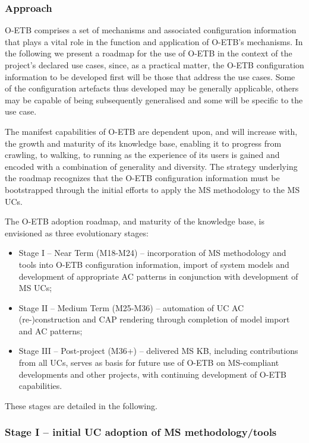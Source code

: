 \documentclass[12pt,twoside,a4paper]{article}
\begin{document}
\hypertarget{approach}{%
\subsubsection{Approach}\label{approach}}

O-ETB comprises a set of mechanisms and associated configuration information that plays a vital role in the function and application of O-ETB's mechanisms. In the following we present a roadmap for the use of O-ETB in the context of the project's declared use cases, since, as a practical matter, the O-ETB configuration information to be developed first will be those that address the use cases. Some of the configuration artefacts thus developed may be generally applicable, others may be capable of being subsequently generalised and some will be specific to the use case.

The manifest capabilities of O-ETB are dependent upon, and will increase with, the growth and maturity of its knowledge base, enabling it to progress from crawling, to walking, to running as the experience of its users is gained and encoded with a combination of generality and diversity. The strategy underlying the roadmap recognizes that the O-ETB configuration information must be bootstrapped through the initial efforts to apply the MS methodology to the MS UCs.

The O-ETB adoption roadmap, and maturity of the knowledge base, is envisioned as three evolutionary stages:

\begin{itemize}
\item
  Stage I -- Near Term (M18-M24) -- incorporation of MS methodology and tools into O-ETB configuration information, import of system models and development of appropriate AC patterns in conjunction with development of MS UCs;
\item
  Stage II -- Medium Term (M25-M36) -- automation of UC AC (re-)construction and CAP rendering through completion of model import and AC patterns;
\item
  Stage III -- Post-project (M36+) -- delivered MS KB, including contributions from all UCs, serves as basis for future use of O-ETB on MS-compliant developments and other projects, with continuing development of O-ETB capabilities.
\end{itemize}

These stages are detailed in the following.

\hypertarget{stage-i-initial-uc-adoption-of-ms-methodologytools}{%
\subsubsection{Stage I -- initial UC adoption of MS methodology/tools}\label{stage-i-initial-uc-adoption-of-ms-methodologytools}}
\end{document}
